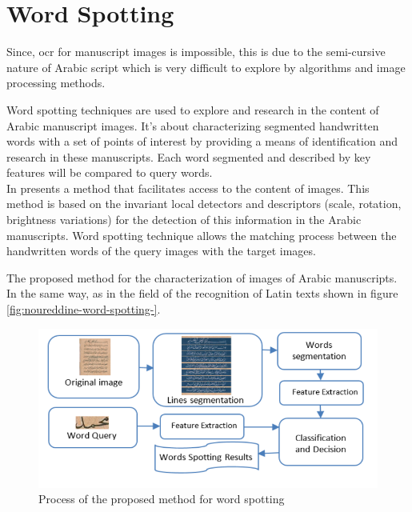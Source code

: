 \section{Word Spotting}
Since, \acrshort{ocr} for manuscript images is impossible, this is due to the semi-cursive nature of Arabic script which is very difficult to explore by algorithms and image processing methods.

\noindent
Word spotting techniques are used to explore and research in the content of Arabic manuscript images. It’s about characterizing segmented handwritten words with a set of points of interest by providing a means of identification and research in these manuscripts. Each word segmented and described by key features will be compared to query words. \\

In \cite{Noureddine} presents a method that facilitates access to the content of images. This method is based on the invariant local detectors and descriptors (scale, rotation, brightness variations) for the detection of this information in the Arabic manuscripts. Word spotting technique allows the matching process between the handwritten words of the query images with the target images. 

The proposed method for the characterization of images of Arabic manuscripts. In the same way, as in the field of the recognition of Latin texts shown in figure \ref{fig:noureddine-word-spotting-}.
\begin{figure}[!htb]
    \centering
    \includegraphics[width=13cm]{images/noureddine-word-spotting.png}
    \caption{Process of the proposed method for word spotting}
    \label{fig:noureddine-word-spotting}
\end{figure}

